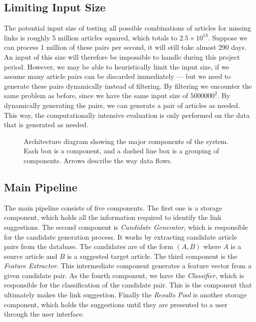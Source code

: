 \subsection{Limiting Input Size}
The potential input size of testing all possible combinations of articles for missing links is roughly 5 million articles squared, which totals to $2.5 \times 10^{13}$. Suppose we can process 1 million of these pairs per second, it will still take almost 290 days. An input of this size will therefore be impossible to handle during this project period. However, we may be able to heuristically limit the input size, if we assume many article pairs can be discarded immediately --- but we need to generate these pairs dynamically instead of filtering. By filtering we encounter the same problem as before, since we have the same input size of $\num{5000000}^2$. By dynamically generating the pairs, we can generate a pair of articles as needed. This way, the computationally intensive evaluation is only performed on the data that is generated as needed.

\begin{figure}[tb]%
  \centering
  
\caption[Architecture diagram showing the major components of the system]{Architecture diagram showing the major components of the system. Each box is a component, and a dashed line box is a grouping of components. Arrows describe the way data flows.}%
\label{fig:system-overview}%
\end{figure}

\subsection{Main Pipeline}
The main pipeline consists of five components. The first one is a storage component, which holds all the information required to identify the link suggestions. The second component is \emph{Candidate Generator}, which is responsible for the candidate generation process. It works by extracting candidate article pairs from the database. The candidates are of the form $(A,B)$ where $A$ is a source article and $B$ is a suggested target article. The third component is the \emph{Feature Extractor}. This intermediate component generates a feature vector from a given candidate pair. As the fourth component, we have the \emph{Classifier}, which is responsible for the classification of the candidate pair. This is the component that ultimately makes the link suggestion. Finally the \emph{Results Pool} is another storage component, which holds the suggestions until they are presented to a user through the user interface.

